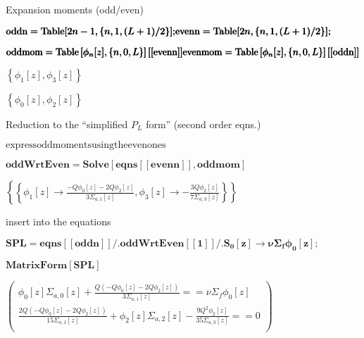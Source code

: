 \documentclass{article}
\begin{document}
Expansion moments (odd/even)

\begin{doublespace}
\noindent\(\pmb{\text{oddn}=\text{Table}[2n-1,\{n,1,(L+1)/2\}];}\\
\pmb{\text{evenn}=\text{Table}[2n,\{n,1,(L+1)/2\}];}\)
\end{doublespace}

\begin{doublespace}
\noindent\(\pmb{\text{oddmom}=\text{Table}\left[\phi _n[z],\{n,0,L\}\right][[\text{evenn}]]}\\
\pmb{\text{evenmom}=\text{Table}\left[\phi _n[z],\{n,0,L\}\right][[\text{oddn}]]}\)
\end{doublespace}

\begin{doublespace}
\noindent\(\left\{\phi _1[z],\phi _3[z]\right\}\)
\end{doublespace}

\begin{doublespace}
\noindent\(\left\{\phi _0[z],\phi _2[z]\right\}\)
\end{doublespace}

Reduction to the {``}simplified \(P_L\) form{''} (second order eqns.)

\(\text{express} \text{odd} \text{moments} \text{using} \text{the} \text{even} \text{ones}\)

\begin{doublespace}
\noindent\(\pmb{\text{oddWrtEven}=\text{Solve}[\text{eqns}[[\text{evenn}]],\text{oddmom}]}\)
\end{doublespace}

\begin{doublespace}
\noindent\(\left\{\left\{\phi _1[z]\to \frac{-Q \phi _0[z]-2 Q \phi _2[z]}{3 \Sigma _{a,1}[z]},\phi _3[z]\to -\frac{3 Q \phi _2[z]}{7 \Sigma _{a,3}[z]}\right\}\right\}\)
\end{doublespace}

insert into the equations

\begin{doublespace}
\noindent\(\pmb{\text{SPL}=\text{eqns}[[\text{oddn}]]\text{/.}\text{oddWrtEven}[[1]]\text{/.}S_0[z]\to \nu \Sigma _f\phi _0[z];}\)
\end{doublespace}

\begin{doublespace}
\noindent\(\pmb{\text{MatrixForm}[\text{SPL}]}\)
\end{doublespace}

\begin{doublespace}
\noindent\(\left(
\begin{array}{c}
 \phi _0[z] \Sigma _{a,0}[z]+\frac{Q \left(-Q \phi _0[z]-2 Q \phi _2[z]\right)}{3 \Sigma _{a,1}[z]}==\nu \Sigma _f \phi _0[z] \\
 \frac{2 Q \left(-Q \phi _0[z]-2 Q \phi _2[z]\right)}{15 \Sigma _{a,1}[z]}+\phi _2[z] \Sigma _{a,2}[z]-\frac{9 Q^2 \phi _2[z]}{35 \Sigma _{a,3}[z]}==0
\\
\end{array}
\right)\)
\end{doublespace}
\end{document}
